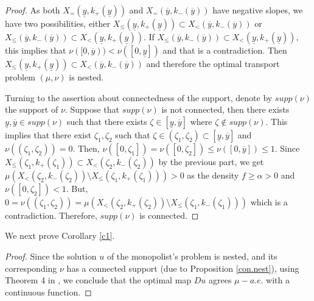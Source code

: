 \documentclass[12pt,reqno]{amsart}
\begin{document}
\begin{proof}
As both  $X_=(\underline{y},k_+(\underline{y}))$ and $X_=(\overline{y},k_-(\overline{y}))$ have negative slopes, we have two possibilities, either $X_\le(\underline{y},k_+(\underline{y}))\subset X_<(\overline{y},k_-(\overline{y}))$ or $X_\le(\overline{y},k_-(\overline{y}))\subset X_<(\underline{y},k_+(\underline{y})).$ If $X_\le(\overline{y},k_-(\overline{y}))\subset X_<(\underline{y},k_+(\underline{y})),$ this implies that $\nu([0,\overline{y}))< \nu([0,\underline{y}])$ and that is a contradiction. Then $X_\le(\underline{y},k_+(\underline{y}))\subset X_<(\overline{y},k_-(\overline{y})) $ and therefore the optimal transport problem $(\mu,\nu)$ is nested.  

Turning to the assertion about connectedness of the support, denote by $supp(\nu)$ the support of $\nu.$ Suppose that $supp(\nu)$ is not connected, then there exists $\underline{y},\overline{y}\in supp(\nu)$ such that there exists $\zeta\in[\underline{y},\overline{y}]$ where $\zeta\notin supp(\nu).$ This implies that there exist $\zeta_1,\zeta_2$ such that $\zeta\in(\zeta_1,\zeta_2)\subset [\underline{y},\overline{y}]$ and $\nu((\zeta_1,\zeta_2))=0.$ Then, $\nu([0,\zeta_1])=\nu([0,\zeta_2])\le\nu([0,\overline{y}])\le1.$ Since  $X_{\le}(\zeta_1,k_+(\zeta_1))\subset X_<(\zeta_2,k_-(\zeta_2))$ by the previous part, we get $\mu(X_<(\zeta_2,k_-(\zeta_2))\setminus X_{\le}(\zeta_1,k_+(\zeta_1)))>0$ as the density $f\ge\alpha>0$ and $\nu([0,\zeta_2])<1.$ But, $0=\nu((\zeta_1,\zeta_2))=\mu(X_<(\zeta_2,k_+(\zeta_2))\setminus X_{\le}(\zeta_1,k_-(\zeta_1)))$ which is a contradiction. Therefore, $supp(\nu)$ is connected. 
\end{proof}
We next prove Corollary \ref{c1}.
\begin{proof}
    Since the solution $u$ of the monopolist's problem is nested, and its corresponding $\nu$ has a connected support (due to Proposition \ref{con.nest}), using Theorem 4 in \cite{ChiapporiMcCannPass17}, we conclude that the optimal map $Du$ agrees $\mu-a.e.$ with a continuous function.
\end{proof}
\end{document}

